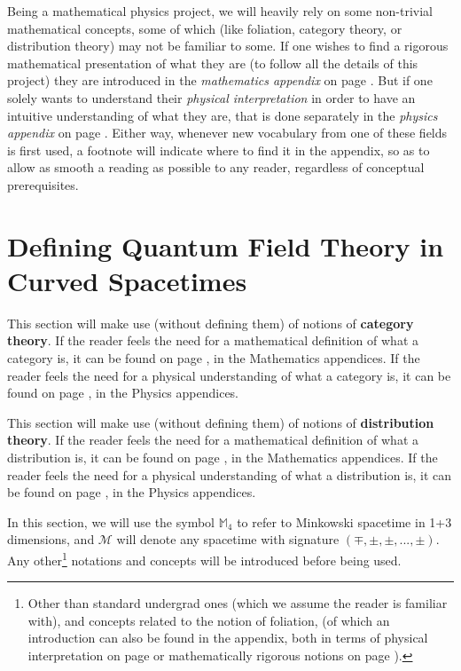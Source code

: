 \documentclass[a4paper,11pt]{article}
\numberwithin{equation}{section}
\theoremstyle{definition}
\begin{document}
Being a mathematical physics project, we will heavily rely on some non-trivial mathematical concepts, some of which (like foliation, category theory, or distribution theory) may not be familiar to some. If one wishes to find a rigorous mathematical presentation of what they are (to follow all the details of this project) they are introduced in the \textit{mathematics appendix} on page \pageref{AnMaCat}. But if one solely wants to understand their \textit{physical interpretation} in order to have an intuitive understanding of what they are, that is done separately in the \textit{physics appendix} on page \pageref{AnPhCat}. Either way, whenever new vocabulary from one of these fields is first used, a footnote will indicate where to find it in the appendix, so as to allow as smooth a reading as possible to any reader, regardless of conceptual prerequisites.


\newpage
\tableofcontents
\newpage
\section{Defining Quantum Field Theory in Curved Spacetimes}
This section will make use (without defining them) of notions of \textbf{category theory}. If the reader feels the need for a mathematical definition of what a category is, it can be found on page \pageref{AnMaCat}, in the Mathematics appendices. If the reader feels the need for a physical understanding of what a category is, it can be found on page \pageref{AnPhCat}, in the Physics appendices.

This section will make use (without defining them) of notions of \textbf{distribution theory}. If the reader feels the need for a mathematical definition of what a distribution is, it can be found on page \pageref{DistribMath}, in the Mathematics appendices. If the reader feels the need for a physical understanding of what a distribution is, it can be found on page \pageref{DistribPhy}, in the Physics appendices.

In this section, we will use the symbol $\mathbb{M}_4$ to refer to Minkowski spacetime in 1+3 dimensions, and $\mathcal{M}$ will denote any spacetime with signature $(\mp, \pm,\pm, ..., \pm)$. Any other\footnote{Other than standard undergrad ones (which we assume the reader is familiar with), and concepts related to the notion of foliation, (of which an introduction can also be found in the appendix, both in terms of physical interpretation on page \pageref{PhyFoli} or mathematically rigorous notions on page \pageref{MatFoli}).} notations and concepts will be introduced before being used.
\end{document}

